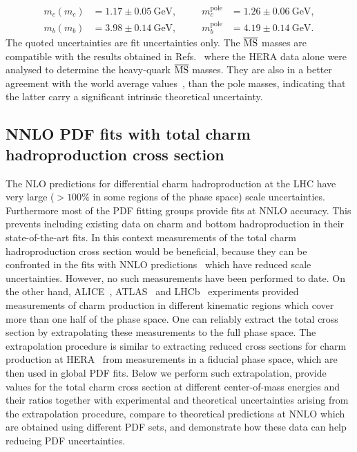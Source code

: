 \documentclass[12pt,a4paper]{article}
\newcommand{\msbar}{\ensuremath{\overline{\rm MS}}\xspace}
\begin{document}
\begin{equation}
\begin{aligned}
m_c(m_c) &= 1.17 \pm 0.05~\textrm{GeV},~~~~~~~~ &m_c^{\textrm{pole}} &= 1.26 \pm 0.06 ~\textrm{GeV},\\
m_b(m_b) &= 3.98 \pm 0.14 ~\textrm{GeV},~~~~~~~~ &m_b^{\textrm{pole}} &= 4.19 \pm 0.14 ~\textrm{GeV}.
\end{aligned}
\label{eq:dztocc}
\end{equation}
The quoted uncertainties are fit uncertainties only.
The \msbar masses are compatible with the results obtained in Refs.~\cite{Abramowicz:1900rp,Abramowicz:2014zub,Bertone:2016ywq,H1:2018flt} where the HERA data alone were analysed to determine the heavy-quark \msbar masses. They are also in a better agreement with the world average values~\cite{Tanabashi:2018oca}, than the pole masses, indicating that the latter carry a significant intrinsic theoretical uncertainty.

\subsection{NNLO PDF fits with total charm hadroproduction cross section}
The NLO predictions for differential charm hadroproduction at the LHC have very large ($>100\%$ in some regions of the phase space) scale uncertainties. Furthermore most of the PDF fitting groups provide fits at NNLO accuracy. This prevents including existing data on charm and bottom hadroproduction in their state-of-the-art fits. In this context measurements of the total charm hadroproduction cross section would be beneficial, because they can be confronted in the fits with NNLO predictions~\cite{Baernreuther:2012ws,Czakon:2012zr,Czakon:2012pz,Czakon:2013goa} which have reduced scale uncertainties. However, no such measurements have been performed to date. On the other hand, ALICE~\cite{Acharya:2017jgo,Acharya:2019mgn}, ATLAS~\cite{Aad:2015zix} and LHCb~\cite{Aaij:2013mga,Aaij:2015bpa,Aaij:2016jht} experiments provided measurements of charm production in different kinematic regions which cover more than one half of the phase space. One can reliably extract the total cross section by extrapolating these measurements to the full phase space. The extrapolation procedure is similar to extracting reduced cross sections for charm production at HERA~\cite{H1:2018flt} from measurements in a fiducial phase space, which are then used in global PDF fits. Below we perform such extrapolation, provide values for the total charm cross section at different center-of-mass energies and their ratios together with experimental and theoretical uncertainties arising from the extrapolation procedure, compare to theoretical predictions at NNLO which are obtained using different PDF sets, and demonstrate how these data can help reducing PDF uncertainties.
\end{document}
